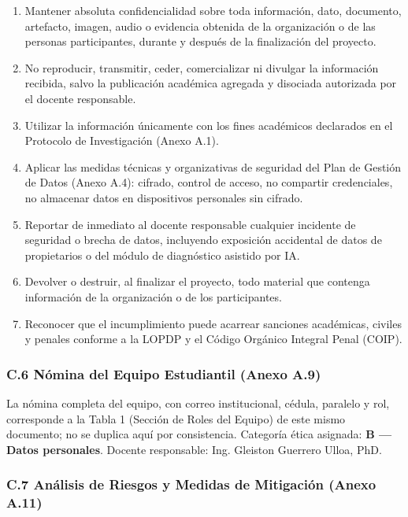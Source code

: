 \documentclass[
]{article}
\begin{document}
\begin{enumerate}
  \item Mantener absoluta confidencialidad sobre toda información, dato, documento, artefacto, imagen, audio o evidencia obtenida de la organización o de las personas participantes, durante y después de la finalización del proyecto.
  \item No reproducir, transmitir, ceder, comercializar ni divulgar la información recibida, salvo la publicación académica agregada y disociada autorizada por el docente responsable.
  \item Utilizar la información únicamente con los fines académicos declarados en el Protocolo de Investigación (Anexo A.1).
  \item Aplicar las medidas técnicas y organizativas de seguridad del Plan de Gestión de Datos (Anexo A.4): cifrado, control de acceso, no compartir credenciales, no almacenar datos en dispositivos personales sin cifrado.
  \item Reportar de inmediato al docente responsable cualquier incidente de seguridad o brecha de datos, incluyendo exposición accidental de datos de propietarios o del módulo de diagnóstico asistido por IA.
  \item Devolver o destruir, al finalizar el proyecto, todo material que contenga información de la organización o de los participantes.
  \item Reconocer que el incumplimiento puede acarrear sanciones académicas, civiles y penales conforme a la LOPDP y el Código Orgánico Integral Penal (COIP).
\end{enumerate}

\subsubsection{C.6 Nómina del Equipo Estudiantil (Anexo A.9)}\label{c6-nomina-equipo}

La nómina completa del equipo, con correo institucional, cédula, paralelo y rol, corresponde a la Tabla 1 (Sección de Roles del Equipo) de este mismo documento; no se duplica aquí por consistencia. Categoría ética asignada: \textbf{B --- Datos personales}. Docente responsable: Ing. Gleiston Guerrero Ulloa, PhD.

\subsubsection{C.7 Análisis de Riesgos y Medidas de Mitigación (Anexo A.11)}\label{c7-analisis-riesgos}
\end{document}
